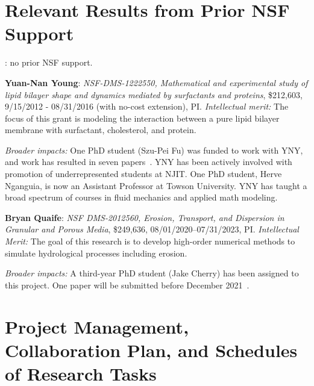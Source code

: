 \section{Relevant Results from Prior NSF Support}
: no prior NSF support.

\noindent
{\bf Yuan-Nan Young}: {\em NSF-DMS-1222550, Mathematical and
experimental study of lipid bilayer shape and dynamics mediated by
surfactants and proteins}, \$212,603, 9/15/2012 - 08/31/2016 (with
no-cost extension), PI. {\em Intellectual merit:} The focus of this
grant is modeling the interaction between a pure lipid bilayer membrane
with surfactant, cholesterol, and protein.


\noindent
{\it Broader impacts:} 
One PhD student (Szu-Pei Fu) was funded to work with YNY, and work has
resulted in seven papers~\cite{Nganguia2013_PoF, Nganguia2013_PRE,
Young2014_JFM, Young2015_PoF, Nganguia2015_CiCP,
Pak2015_PNAS,fu2015pre}. YNY has been actively involved with promotion
of underrepresented students at NJIT. One PhD student, Herve Nganguia,
is now an Assistant Professor at Towson University. YNY has taught a
broad spectrum of courses in fluid mechanics and applied math modeling.

\noindent
{\bf Bryan Quaife}: {\em NSF DMS-2012560, Erosion, Transport, and
Dispersion in Granular and Porous Media}, \$249,636,
08/01/2020--07/31/2023, PI. {\em Intellectual Merit:} The goal of this
research is to develop high-order numerical methods to
simulate hydrological processes including erosion.

\noindent
{\it Broader impacts:} 
A third-year PhD student (Jake Cherry) has been assigned to this
project. One paper will be submitted before December
2021~\cite{che-lin-her-qua2022}.

\section{Project Management, Collaboration Plan, and Schedules of
Research Tasks}
\setlength{\parindent}{0pt}

